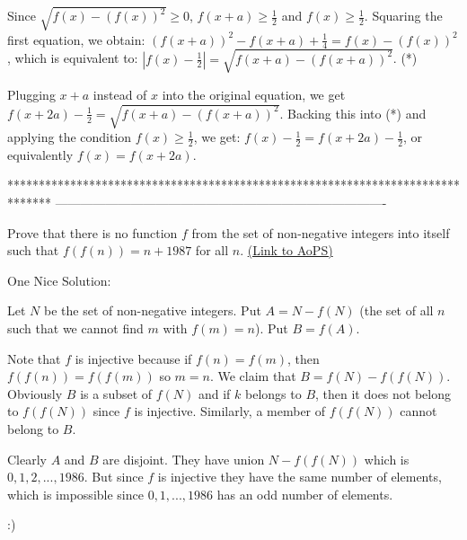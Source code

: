 \begin{solution}
	Since $\sqrt{f(x)-(f(x))^{2}}\geq 0$, $f(x+a)\geq \frac{1}{2}$ and $f(x)\geq \frac{1}{2}$. 
Squaring the first equation, we obtain:
$(f(x+a))^{2}-f(x+a)+\frac{1}{4}=f(x)-(f(x))^{2}$, which is equivalent to: $|f(x)-\frac{1}{2}|=\sqrt{f(x+a)-(f(x+a))^{2}}$.  (*)

Plugging $x+a$ instead of $x$ into the original equation, we get $f(x+2a)-\frac{1}{2}=\sqrt{f(x+a)-(f(x+a))^{2}}$. Backing this into (*) and applying the condition $f(x)\geq \frac{1}{2}$, we get: $ f(x)-\frac{1}{2}=f(x+2a)-\frac{1}{2} $, or equivalently $f(x)=f(x+2a)$.
\end{solution}
*******************************************************************************
-------------------------------------------------------------------------------

\begin{problem}
	Prove that there is no function $f$ from the set of non-negative integers into itself such that $f(f(n))=n+1987$ for all $n$.
	\flushright \href{https://artofproblemsolving.com/community/c6h60761}{(Link to AoPS)}
\end{problem}



\begin{solution}
	One Nice Solution:


Let $N$ be the set of non-negative integers. Put $A = N - f(N)$
(the set of all $n$ such that we cannot find $m$ with $f(m) = n$).
Put $B = f(A)$. 

Note that $f$ is injective because if $f(n) = f(m)$, then $f(f(n)) = f(f(m))$ so $m = n$.
We claim that $B = f(N) - f(f(N))$.
Obviously $B$ is a subset of $f(N)$ and if $k$ belongs to $B$,
then it does not belong to $f(f(N))$ since $f$ is injective.
Similarly, a member of $f(f(N))$ cannot belong to $B$. 

Clearly $A$ and $B$ are disjoint. 
They have union $N - f(f(N))$ which is ${0, 1, 2, ... , 1986}$.
But since $f$ is injective they have the same number of elements, 
which is impossible since ${0, 1, ... , 1986}$ has an odd number of elements. 

 :)
\end{solution}



